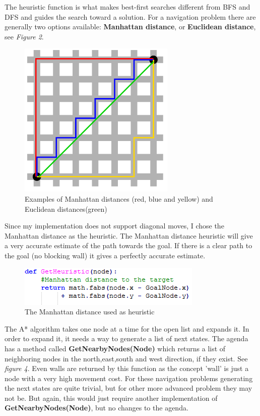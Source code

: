 \documentclass[11pt]{article}
\begin{document}
\vspace{5mm}

The heuristic function is what makes best-first searches different from BFS and DFS and guides the search toward a solution. For a navigation problem there are generally two options available: \textbf{Manhattan distance}, or \textbf{Euclidean distance}, see \textit{Figure 2}. 

\begin{figure}[h]
\centerline{\includegraphics[scale=0.4]{Manhattan_distance_figure.png}}
\caption{Examples of Manhattan distances (red, blue and yellow) and Euclidean distances(green)}
\end{figure}


Since my implementation does not support diagonal moves, I chose the Manhattan distance as the heuristic. The Manhattan distance heuristic will give a very accurate estimate of the path towards the goal. If there is a clear path to the goal (no blocking wall) it gives a perfectly accurate estimate.

\begin{figure}[h]
\includegraphics[scale=1.0]{heuristic_function.png}
\caption{The Manhattan distance used as heuristic}
\end{figure}


The A* algorithm takes one node at a time for the open list and expands it. In order to expand it, it needs a way to generate a list of next states. The agenda has a method called \textbf{GetNearbyNodes(Node)} which returns a list of neighboring nodes in the north,east,south and west direction, if they exist. See \textit{figure 4}. Even walls are returned by this function as the concept 'wall' is just a node with a very high movement cost. For these navigation problems generating the next states are quite trivial, but for other more advanced problem they may not be. But again, this would just require another implementation of \textbf{GetNearbyNodes(Node)}, but no changes to the agenda.
\end{document}
